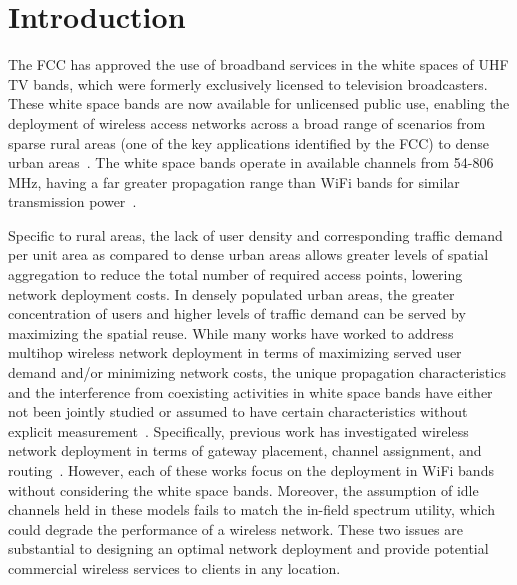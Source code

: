 \section{Introduction}
\label{sec:introduction}



The FCC has approved the use of broadband services in the white spaces of 
UHF TV bands, which were formerly exclusively licensed to television broadcasters.
These white space bands are now available for unlicensed public use, enabling the
deployment of wireless access networks across a broad range of scenarios from 
sparse rural areas (one of the key applications identified by the FCC) to dense urban 
areas~\cite{carlson}. The white space bands operate in available channels from 
54-806 MHz, having a far greater propagation range than WiFi bands for similar
transmission power~\cite{balanis2012antenna}. 

Specific to rural areas, the lack of user density and corresponding traffic
demand per unit area as compared to dense urban areas allows greater levels of
spatial aggregation to reduce the total number of required access points, lowering
network deployment costs. In densely populated urban areas, the greater concentration
of users and higher levels of traffic demand can be served by maximizing the spatial
reuse. While many works have worked to address multihop wireless network deployment
in terms of maximizing served user demand and/or minimizing network costs,
the unique propagation characteristics and the interference from coexisting
activities in white space bands have either not been jointly studied or assumed to 
have certain characteristics without explicit measurement~\cite{si2010overview}. 
Specifically, previous work has investigated wireless 
network deployment in terms of gateway placement, channel assignment, and 
routing~\cite{he2008optimizing,marina2010topology}.
However, each of these works focus on the deployment in WiFi bands without
considering the white space bands. Moreover, the assumption of idle channels
held in these models fails to match the in-field spectrum utility,
which could degrade the performance of a wireless network. These
two issues are substantial to designing an optimal network deployment and
provide potential commercial wireless services to clients in any location.

